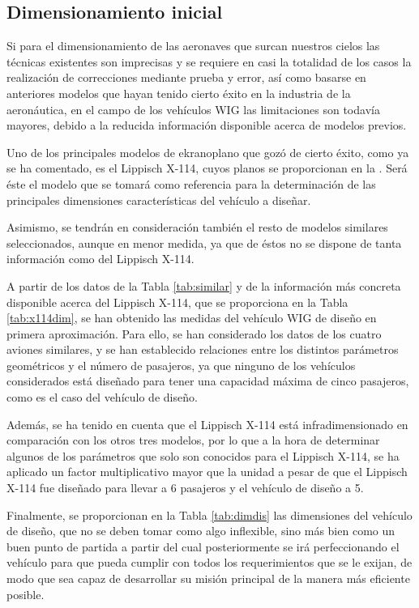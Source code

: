 \subsection{Dimensionamiento inicial}
\label{sec:design:sizing}

Si para el dimensionamiento de las aeronaves que surcan nuestros cielos las técnicas existentes son imprecisas y se requiere en casi la totalidad de los casos la realización de correcciones mediante prueba y error, así como basarse en anteriores modelos que hayan tenido cierto éxito en la industria de la aeronáutica, en el campo de los vehículos WIG las limitaciones son todavía mayores, debido a la reducida información disponible acerca de modelos previos.

Uno de los principales modelos de ekranoplano que gozó de cierto éxito, como ya se ha comentado, es el Lippisch X-114, cuyos planos se proporcionan en la . Será éste el modelo que se tomará como referencia para la determinación de las principales dimensiones características del vehículo a diseñar.

Asimismo, se tendrán en consideración también el resto de modelos similares seleccionados, aunque en menor medida, ya que de éstos no se dispone de tanta información como del Lippisch X-114.

A partir de los datos de la Tabla \ref{tab:similar} y de la información más concreta disponible acerca del Lippisch X-114, que se proporciona en la Tabla \ref{tab:x114dim}, se han obtenido las medidas del vehículo WIG de diseño en primera aproximación. Para ello, se han considerado los datos de los cuatro aviones similares, y se han establecido relaciones entre los distintos parámetros geométricos y el número de pasajeros, ya que ninguno de los vehículos considerados está diseñado para tener una capacidad máxima de cinco pasajeros, como es el caso del vehículo de diseño.

Además, se ha tenido en cuenta que el Lippisch X-114 está infradimensionado en comparación con los otros tres modelos, por lo que a la hora de determinar algunos de los parámetros que solo son conocidos para el Lippisch X-114, se ha aplicado un factor multiplicativo mayor que la unidad a pesar de que el Lippisch X-114 fue diseñado para llevar a 6 pasajeros y el vehículo de diseño a 5.

Finalmente, se proporcionan en la Tabla \ref{tab:dimdis} las dimensiones del vehículo de diseño, que no se deben tomar como algo inflexible, sino más bien como un buen punto de partida a partir del cual posteriormente se irá perfeccionando el vehículo para que pueda cumplir con todos los requerimientos que se le exijan, de modo que sea capaz de desarrollar su misión principal de la manera más eficiente posible.

